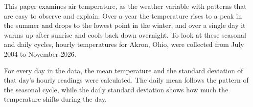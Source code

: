 This paper examines air temperature, as the weather variable with patterns that are easy to observe and explain. Over a year the temperature rises to a peak in the summer and drops to the lowest point in the winter, and over a single day it warms up after sunrise and cools back down overnight. To look at these seasonal and daily cycles, hourly temperatures for Akron, Ohio, were collected from July 2004 to November 2026.

For every day in the data, the mean temperature and the standard deviation of that day's hourly readings were calculated. The daily mean follows the pattern of the seasonal cycle, while the daily standard deviation shows how much the temperature shifts during the day.